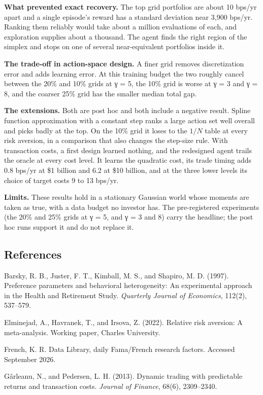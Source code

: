 \documentclass[
  11pt]{article}
\begin{document}
\textbf{What prevented exact recovery.} The top grid portfolios are
about 10 bps/yr apart and a single episode's reward has a standard
deviation near 3,900 bps/yr. Ranking them reliably would take about a
million evaluations of each, and exploration supplies about a thousand.
The agent finds the right region of the simplex and stops on one of
several near-equivalent portfolios inside it.

\textbf{The trade-off in action-space design.} A finer grid removes
discretization error and adds learning error. At this training budget
the two roughly cancel between the 20\% and 10\% grids at γ = 5, the
10\% grid is worse at γ = 3 and γ = 8, and the coarser 25\% grid has the
smaller median total gap.

\textbf{The extensions.} Both are post hoc and both include a negative
result. Spline function approximation with a constant step ranks a large
action set well overall and picks badly at the top. On the 10\% grid it
loses to the \(1/N\) table at every risk aversion, in a comparison that
also changes the step-size rule. With transaction costs, a first design
learned nothing, and the redesigned agent trails the oracle at every
cost level. It learns the quadratic cost, its trade timing adds 0.8
bps/yr at \$1 billion and 6.2 at \$10 billion, and at the three lower
levels its choice of target costs 9 to 13 bps/yr.

\textbf{Limits.} These results hold in a stationary Gaussian world whose
moments are taken as true, with a data budget no investor has. The
pre-registered experiments (the 20\% and 25\% grids at γ = 5, and γ = 3
and 8) carry the headline; the post hoc runs support it and do not
replace it.

\subsection{References}\label{references}

Barsky, R. B., Juster, F. T., Kimball, M. S., and Shapiro, M. D. (1997).
Preference parameters and behavioral heterogeneity: An experimental
approach in the Health and Retirement Study. \emph{Quarterly Journal of
Economics}, 112(2), 537--579.

Elminejad, A., Havranek, T., and Irsova, Z. (2022). Relative risk
aversion: A meta-analysis. Working paper, Charles University.

French, K. R. Data Library, daily Fama/French research factors. Accessed
September 2026.

Gârleanu, N., and Pedersen, L. H. (2013). Dynamic trading with
predictable returns and transaction costs. \emph{Journal of Finance},
68(6), 2309--2340.
\end{document}
